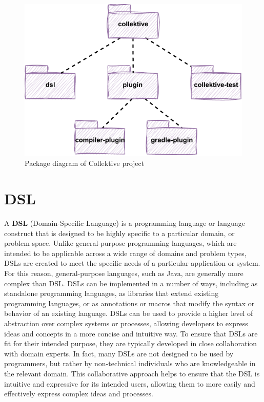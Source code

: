 \begin{figure}[!ht]
    \centering
    \includegraphics[scale=1.1]{document/chapters/4-collektive/images/collektive_package_diagram.pdf}
    \caption{Package diagram of Collektive project}
    \label{fig:collektive_package_diagram}
\end{figure}

\section{DSL}\label{section:dsl}
A \textbf{DSL} (Domain-Specific Language) \cite{dsl_definition} is a programming language or language construct that is designed to be highly specific to a particular domain, or problem space. Unlike general-purpose programming languages, which are intended to be applicable across a wide range of domains and problem types, DSLs are created to meet the specific needs of a particular application or system. For this reason, general-purpose languages, such as Java, are generally more complex than DSL.\newline 
DSLs can be implemented in a number of ways, including as standalone programming languages, as libraries that extend existing programming languages, or as annotations or macros that modify the syntax or behavior of an existing language. DSLs can be used to provide a higher level of abstraction over complex systems or processes, allowing developers to express ideas and concepts in a more concise and intuitive way.\newline
To ensure that DSLs are fit for their intended purpose, they are typically developed in close collaboration with domain experts. In fact, many DSLs are not designed to be used by programmers, but rather by non-technical individuals who are knowledgeable in the relevant domain. This collaborative approach helps to ensure that the DSL is intuitive and expressive for its intended users, allowing them to more easily and effectively express complex ideas and processes.

